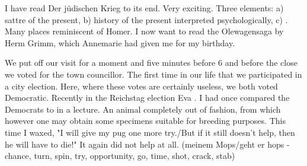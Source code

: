 \missing

I have read Der jüdischen Krieg to its end. Very exciting. Three elements: a) sattre of the present, b) history of the present interpreted psychologically, c) . Many places reminiscent of Homer. I now want to read the Olewagensaga by Herm Grimm, which Annemarie had given me for my birthday. \missing

We put off our visit for a moment and five minutes before 6 and before the close we voted for the town councillor. The first time in our life that we participated in a city election. Here, where these votes are certainly useless, we both voted Democratic. Recently in the Reichstag election Eva . I had once compared the Democrats to  in a lecture. An animal completely out of fashion, from which however one may obtain some specimens suitable for breeding purposes. This time I waxed, "I will give my pug one more try./But if it still doesn't help, then he will have to die!" It again did not help at all.
(meinem Mops/geht er hops - chance, turn, spin, try, opportunity, go, time, shot, crack, stab)
\missing